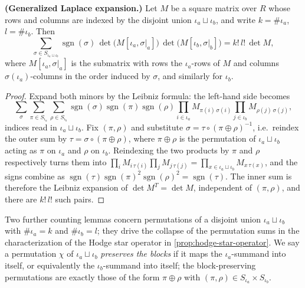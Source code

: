 \begin{proposition}
\label{lem:laplace-expansion-block}
\leanok
\textbf{(Generalized Laplace expansion.)} Let $M$ be a square matrix over $R$ whose rows and columns are indexed by the disjoint union $\iota_a \sqcup \iota_b$, and write $k = \#\iota_a$, $l = \#\iota_b$. Then
\[
\sum_{\sigma \in S_{\iota_a \sqcup \iota_b}} \operatorname{sgn}(\sigma)\, \det\big(M[\iota_a, \sigma|_a]\big)\, \det\big(M[\iota_b, \sigma|_b]\big) = k!\, l!\, \det M,
\]
where $M[\iota_a, \sigma|_a]$ is the submatrix with rows the $\iota_a$-rows of $M$ and columns $\sigma(\iota_a)$-columns in the order induced by $\sigma$, and similarly for $\iota_b$.
\end{proposition}
\begin{proof}
\leanok
Expand both minors by the Leibniz formula: the left-hand side becomes
\[
\sum_{\sigma} \sum_{\pi \in S_{\iota_a}} \sum_{\rho \in S_{\iota_b}} \operatorname{sgn}(\sigma)\operatorname{sgn}(\pi)\operatorname{sgn}(\rho) \prod_{i \in \iota_a} M_{\pi(i)\, \sigma(i)} \prod_{j \in \iota_b} M_{\rho(j)\, \sigma(j)},
\]
indices read in $\iota_a \sqcup \iota_b$. Fix $(\pi, \rho)$ and substitute $\sigma = \tau \circ (\pi \oplus \rho)^{-1}$, i.e.\ reindex the outer sum by $\tau = \sigma \circ (\pi \oplus \rho)$, where $\pi \oplus \rho$ is the permutation of $\iota_a \sqcup \iota_b$ acting as $\pi$ on $\iota_a$ and $\rho$ on $\iota_b$. Reindexing the two products by $\pi$ and $\rho$ respectively turns them into $\prod_{i} M_{i\,\tau(i)} \prod_{j} M_{j\,\tau(j)} = \prod_{x \in \iota_a \sqcup \iota_b} M_{x\,\tau(x)}$, and the signs combine as $\operatorname{sgn}(\tau)\operatorname{sgn}(\pi)^2\operatorname{sgn}(\rho)^2 = \operatorname{sgn}(\tau)$. The inner sum is therefore the Leibniz expansion of $\det M^{T} = \det M$, independent of $(\pi, \rho)$, and there are $k!\,l!$ such pairs.
\end{proof}

Two further counting lemmas concern permutations of a disjoint union $\iota_a \sqcup \iota_b$ with $\#\iota_a = k$ and $\#\iota_b = l$; they drive the collapse of the permutation sums in the characterization of the Hodge star operator in \cref{prop:hodge-star-operator}. We say a permutation $\chi$ of $\iota_a \sqcup \iota_b$ \emph{preserves the blocks} if it maps the $\iota_a$-summand into itself, or equivalently the $\iota_b$-summand into itself; the block-preserving permutations are exactly those of the form $\pi \oplus \rho$ with $(\pi, \rho) \in S_{\iota_a} \times S_{\iota_b}$.

